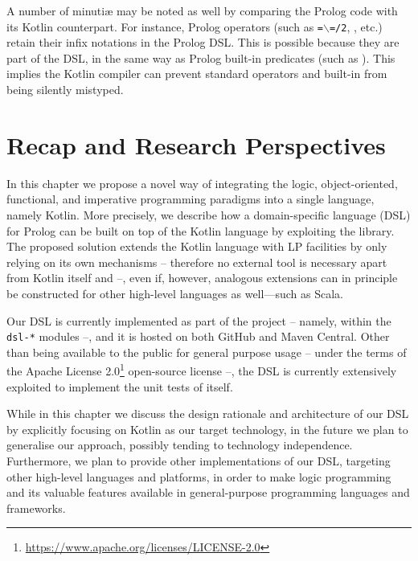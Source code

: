 \documentclass[12pt,a4paper,openright,twoside]{book}
\begin{document}
A number of minuti\ae{} may be noted as well by comparing the Prolog code with its Kotlin counterpart.
%
For instance, Prolog operators (such as \texttt{=$\backslash$=/2}, , etc.) retain their infix notations in the Prolog DSL.
%
This is possible because they are part of the DSL, in the same way as Prolog built-in predicates (such as ).
%
This implies the Kotlin compiler can prevent standard operators and built-in from being silently mistyped.

\section{Recap and Research Perspectives}\label{sec:conclusions}

In this chapter we propose a novel way of integrating the logic, object-oriented, functional, and imperative programming paradigms into a single language, namely Kotlin.
%
More precisely, we describe how a domain-specific language (DSL) for Prolog can be built on top of the Kotlin language by exploiting the \twopkt{} library.
%
The proposed solution extends the Kotlin language with LP facilities by only relying on its own mechanisms -- therefore no external tool is necessary apart from Kotlin itself and \twopkt{} --, even if, however, analogous extensions can in principle be constructed for other high-level languages as well---such as Scala.

Our DSL is currently implemented as part of the \twopkt{} project -- namely, within the \texttt{dsl-*} modules --, and it is hosted on both GitHub \cite{homepage2PKt} and Maven Central.
%
Other than being available to the public for general purpose usage -- under the terms of the Apache License 2.0\footnote{\url{https://www.apache.org/licenses/LICENSE-2.0}} open-source license --, the DSL is currently extensively exploited to implement the unit tests of \twopkt{} itself.

While in this chapter we discuss the design rationale and architecture of our DSL by explicitly focusing on Kotlin as our target technology, in the future we plan to generalise our approach, possibly tending to technology independence.
%
Furthermore, we plan to provide other implementations of our DSL, targeting other high-level languages and platforms, in order to make logic programming and its valuable features available in general-purpose programming languages and frameworks.
\end{document}
